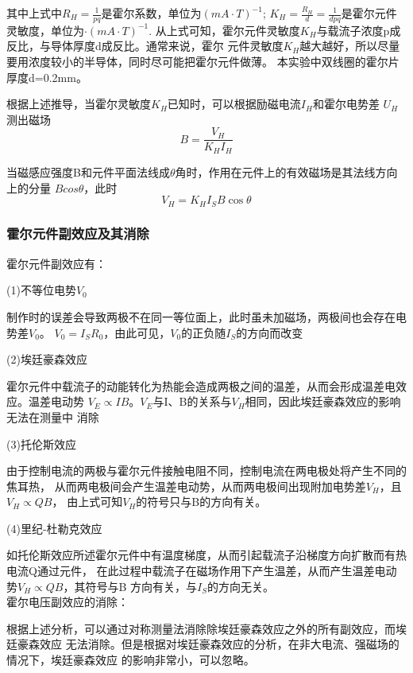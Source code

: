 \documentclass[12pt,a4paper]{article}
\begin{document}
        其中上式中${R_H=}\frac{1}{pq}$是霍尔系数，单位为${(mA \cdot T)^{ - 1}}$;
        ${K_H} = \frac{{{R_H}}}{d} = \frac{1}{{dpq}}$是霍尔元件灵敏度，单位为$\cdot {(mA \cdot T)^{ - 1}}$.
        从上式可知，霍尔元件灵敏度$K_H$与载流子浓度p成反比，与导体厚度d成反比。通常来说，霍尔
        元件灵敏度$K_H$越大越好，所以尽量要用浓度较小的半导体，同时尽可能把霍尔元件做薄。
        本实验中双线圈的霍尔片厚度d=0.2mm。\par
        根据上述推导，当霍尔灵敏度$K_H$已知时，可以根据励磁电流$I_H$和霍尔电势差
        $U_H$测出磁场
        \[B=\frac{V_H}{{K_H}I_H}\]

        当磁感应强度B和元件平面法线成$\theta$角时，作用在元件上的有效磁场是其法线方向上的分量
        $Bcos\theta$，此时
        \[{V_H} = {K_H}{I_S}B\cos \theta \]

        \subsubsection{霍尔元件副效应及其消除}
        霍尔元件副效应有：\par
        (1)不等位电势$V_0$\par
        制作时的误差会导致两极不在同一等位面上，此时虽未加磁场，两极间也会存在电势差$V_0$。
        $V_0={I_S}{R_0}$，由此可见，$V_0$的正负随$I_S$的方向而改变

        (2)埃廷豪森效应\par
        霍尔元件中载流子的动能转化为热能会造成两极之间的温差，从而会形成温差电效应。温差电动势
        $V_E\propto{IB}$。$V_E$与I、B的关系与$V_H$相同，因此埃廷豪森效应的影响无法在测量中
        消除

        (3)托伦斯效应\par
        由于控制电流的两极与霍尔元件接触电阻不同，控制电流在两电极处将产生不同的焦耳热，
        从而两电极间会产生温差电动势，从而两电极间出现附加电势差$V_H$，且$V_H\propto{QB}$，
        由上式可知$V_H$的符号只与B的方向有关。

        (4)里纪-杜勒克效应\par
        如托伦斯效应所述霍尔元件中有温度梯度，从而引起载流子沿梯度方向扩散而有热电流Q通过元件，
        在此过程中载流子在磁场作用下产生温差，从而产生温差电动势$V_H\propto{QB}$，其符号与B
        方向有关，与$I_S$的方向无关。
        ~\\

        霍尔电压副效应的消除：\par
        根据上述分析，可以通过对称测量法消除除埃廷豪森效应之外的所有副效应，而埃廷豪森效应
        无法消除。但是根据对埃廷豪森效应的分析，在非大电流、强磁场的情况下，埃廷豪森效应
        的影响非常小，可以忽略。
\end{document}
